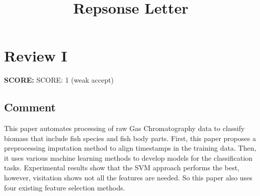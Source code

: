 \documentclass[runningheads]{llncs}
\begin{document}
%
\title{Repsonse Letter}
%
%
%

%
\maketitle              %
%
\begin{abstract}
    
  \keywords{

  }
\end{abstract}

\section{Review I}

\textbf{SCORE:} SCORE: 1 (weak accept)

\subsection{Comment}

This paper automates processing of raw Gas Chromatography data to classify biomass that include fish species and fish body parts. First, this paper proposes a preprocessing imputation method to align timestamps in the training data. Then, it uses various machine learning methods to develop models for the classification tasks. Experimental results show that the SVM approach performs the best, however, visitation shows not all the features are needed. So this paper also uses four existing feature selection methods.
\end{document}
